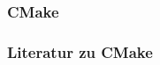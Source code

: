 \begin{frame}
	\frametitle{CMake}
\end{frame}

\begin{frame}
	\frametitle{Literatur zu CMake}
\end{frame}
